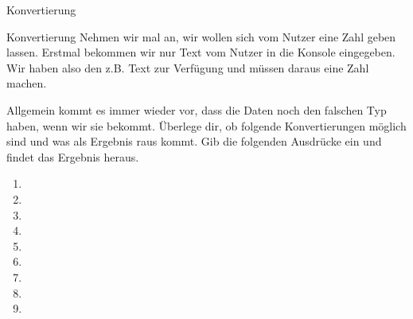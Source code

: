 \begin{task}[points=auto]{Konvertierung }
    \begin{subtask*}[points=0]{Konvertierung}
        Nehmen wir mal an,
        wir wollen sich vom Nutzer eine Zahl geben lassen.
        Erstmal bekommen wir nur Text vom Nutzer
        in die Konsole eingegeben.
        Wir haben also den z.B. Text  zur Verfügung
        und müssen daraus eine Zahl machen.

        Allgemein kommt es immer wieder vor,
        dass die Daten noch den falschen Typ haben,
        wenn wir sie bekommt.
        Überlege dir, ob folgende Konvertierungen möglich sind
        und was als Ergebnis raus kommt.
        Gib die folgenden Ausdrücke ein und findet das Ergebnis heraus.

        \begin{multicols}{3}
            \begin{enumerate}
                \item {}
                \item {}
                \item {}
                \item {}
                \item {}
                \item {}
                \item {}
                \item {}
                \item {}
            \end{enumerate}
        \end{multicols}


\end{subtask*}
\end{task}
